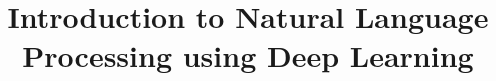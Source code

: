 \documentclass[xcolor=dvipsnames,compress,t,pdf,9pt]{beamer}
\title[\insertframenumber /\inserttotalframenumber]{Introduction to Natural Language Processing using Deep Learning}
\begin{document}
	\begin{frame}
	\titlepage
	\end{frame}
	
%	
	
	
\end{document}
